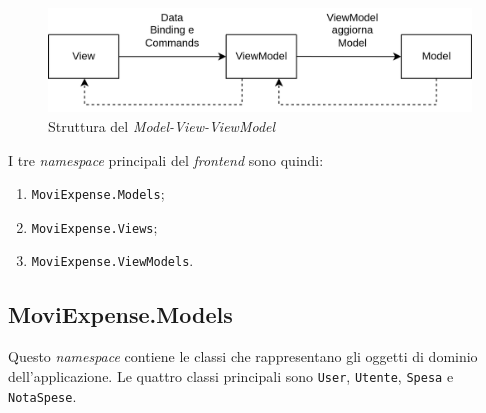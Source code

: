 \begin{figure}[H]
    \centering 
    \includegraphics[width=.9\columnwidth]{images/MVVM.png} 
    \caption{Struttura del \textit{Model-View-ViewModel}}
\end{figure}

I tre \textit{namespace} principali del \textit{frontend} sono quindi:
\begin{enumerate}
    \item \texttt{MoviExpense.Models};
    \item \texttt{MoviExpense.Views};
    \item \texttt{MoviExpense.ViewModels}.
\end{enumerate}

\subsection{MoviExpense.Models}
\label{cap:model}

Questo \textit{namespace} contiene le classi che rappresentano gli oggetti di dominio dell'applicazione. Le quattro classi principali sono \texttt{User}, \texttt{Utente}, \texttt{Spesa} e \texttt{NotaSpese}.

